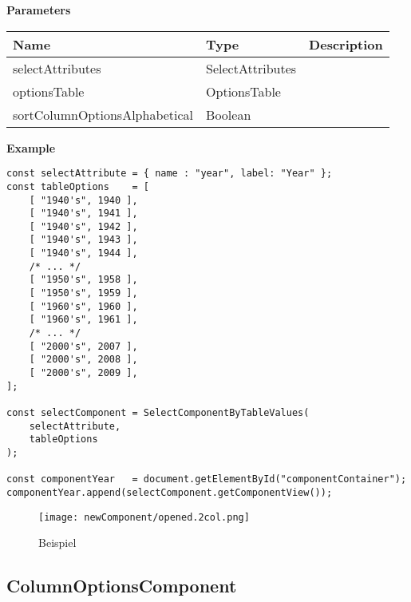 \vspace*{6pt}
\noindent
\textbf{Parameters}

\begin{table}[!htb] 
    \label{api:selectComponentByTableValuesParameter}
    \footnotesize
    \setlength\extrarowheight{4pt}
    \begin{tabular}{ p{4.5cm} p{3cm} p{5.5cm} }
        \toprule[1.2pt]
        \textbf{Name}                 & \textbf{Type}    & \textbf{Description} \\
        \midrule
        selectAttributes              & SelectAttributes &  \\
        optionsTable                  & OptionsTable     &  \\
        sortColumnOptionsAlphabetical & Boolean          &  \\
        \bottomrule[1.2pt]
    \end{tabular}
\end{table}

\vspace*{6pt}
\noindent
\textbf{Example}

\begin{lstlisting}[style = htmlcssjs, label = api:selectComponentTvExample]
const selectAttribute = { name : "year", label: "Year" };
const tableOptions    = [ 
    [ "1940's", 1940 ], 
    [ "1940's", 1941 ], 
    [ "1940's", 1942 ], 
    [ "1940's", 1943 ], 
    [ "1940's", 1944 ], 
    /* ... */
    [ "1950's", 1958 ], 
    [ "1950's", 1959 ], 
    [ "1960's", 1960 ], 
    [ "1960's", 1961 ], 
    /* ... */
    [ "2000's", 2007 ], 
    [ "2000's", 2008 ], 
    [ "2000's", 2009 ], 
];

const selectComponent = SelectComponentByTableValues(
    selectAttribute,
    tableOptions
);

const componentYear   = document.getElementById("componentContainer");
componentYear.append(selectComponent.getComponentView());
\end{lstlisting}
    
\begin{figure}[!htb]
    \centering
    \texttt{[image: newComponent/opened.2col.png]}
    \caption*{\centering Beispiel }
    \label{api:selectComponentTvImg}
\end{figure}


\clearpage
\subsection*{ColumnOptionsComponent}

